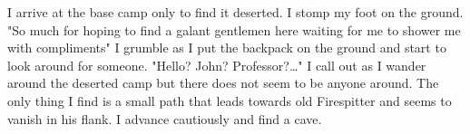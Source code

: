 \newscene

I arrive at the base camp only to find it deserted. I stomp my foot on the ground. "So much for hoping to find a galant gentlemen here waiting for me to shower me with compliments" I grumble as I put the backpack on the ground and start to look around for someone. "Hello? John? Professor?\dots" I call out as I wander around the deserted camp but there does not seem to be anyone around. The only thing I find is a small path that leads towards old Firespitter and seems to vanish in his flank. I advance cautiously and find a cave.
